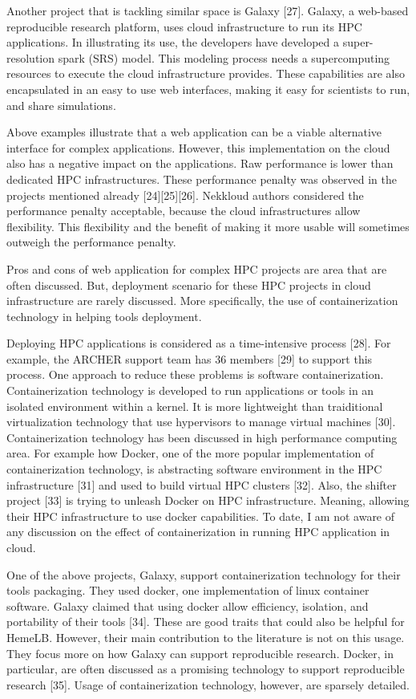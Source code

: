 \documentclass[]{article}
\begin{document}
Another project that is tackling similar space is Galaxy {[}27{]}.
Galaxy, a web-based reproducible research platform, uses cloud
infrastructure to run its HPC applications. In illustrating its use, the
developers have developed a super-resolution spark (SRS) model. This
modeling process needs a supercomputing resources to execute the cloud
infrastructure provides. These capabilities are also encapsulated in an
easy to use web interfaces, making it easy for scientists to run, and
share simulations.

Above examples illustrate that a web application can be a viable
alternative interface for complex applications. However, this
implementation on the cloud also has a negative impact on the
applications. Raw performance is lower than dedicated HPC
infrastructures. These performance penalty was observed in the projects
mentioned already {[}24{]}{[}25{]}{[}26{]}. Nekkloud authors considered
the performance penalty acceptable, because the cloud infrastructures
allow flexibility. This flexibility and the benefit of making it more
usable will sometimes outweigh the performance penalty.

Pros and cons of web application for complex HPC projects are area that
are often discussed. But, deployment scenario for these HPC projects in
cloud infrastructure are rarely discussed. More specifically, the use of
containerization technology in helping tools deployment.

Deploying HPC applications is considered as a time-intensive process
{[}28{]}. For example, the ARCHER support team has 36 members {[}29{]}
to support this process. One approach to reduce these problems is
software containerization. Containerization technology is developed to
run applications or tools in an isolated environment within a kernel. It
is more lightweight than traiditional virtualization technology that use
hypervisors to manage virtual machines {[}30{]}. Containerization
technology has been discussed in high performance computing area. For
example how Docker, one of the more popular implementation of
containerization technology, is abstracting software environment in the
HPC infrastructure {[}31{]} and used to build virtual HPC clusters
{[}32{]}. Also, the shifter project {[}33{]} is trying to unleash Docker
on HPC infrastructure. Meaning, allowing their HPC infrastructure to use
docker capabilities. To date, I am not aware of any discussion on the
effect of containerization in running HPC application in cloud.

One of the above projects, Galaxy, support containerization technology
for their tools packaging. They used docker, one implementation of linux
container software. Galaxy claimed that using docker allow efficiency,
isolation, and portability of their tools {[}34{]}. These are good
traits that could also be helpful for HemeLB. However, their main
contribution to the literature is not on this usage. They focus more on
how Galaxy can support reproducible research. Docker, in particular, are
often discussed as a promising technology to support reproducible
research {[}35{]}. Usage of containerization technology, however, are
sparsely detailed.
\end{document}
